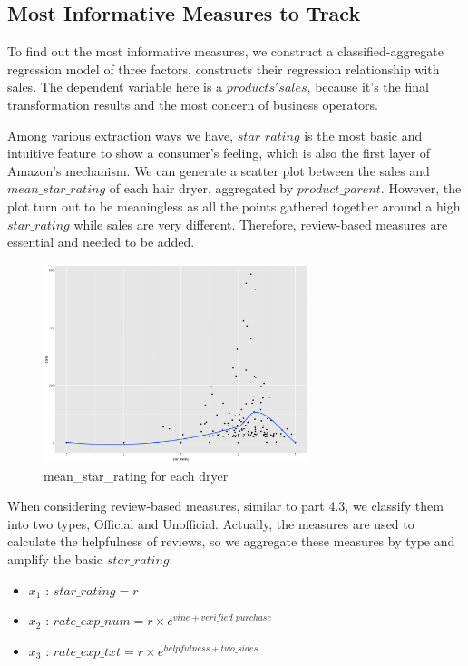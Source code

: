 \documentclass{mcmthesis}
\begin{document}
\subsection{Most Informative Measures to Track}
\quad \quad To find out the most informative measures, we construct a classified-aggregate regression model of three factors, constructs their regression relationship with sales.
The dependent variable here is a $products' sales$, because it's the final transformation results and the most concern of business operators.

Among various extraction ways we have, $star\_rating$ is the most basic and intuitive feature to show a consumer's feeling, which is also the first layer of Amazon's mechanism. We can generate a scatter plot between the sales and  $mean\_star\_rating$ of each hair dryer, aggregated by $product\_parent$. However, the plot turn out to be meaningless as all the points gathered together around a high $star\_rating$ while sales are very different. Therefore, review-based measures are essential and needed to be added.

\begin{figure}[H]
\centering
\includegraphics[width=.8\textwidth,height=5.8cm]{figures/2.png}
\caption{mean\_star\_rating for each dryer}
\end{figure}

When considering review-based measures, similar to part 4.3, we classify them into two types, Official and Unofficial. Actually, the measures are used to calculate the helpfulness of reviews, so we aggregate these measures by type and amplify the basic $ star\_rating$:
\begin{itemize}
    \item $x_{1}$ : $ star\_rating=r$
    \item $x_{2}$ : $ rate\_exp\_num = r \times e^{vine+verified\_purchase} $
    \item $x_{3}$ : $ rate\_exp\_txt = r \times e^{helpfulness+two\_sides} $
\end{itemize}
\end{document}
